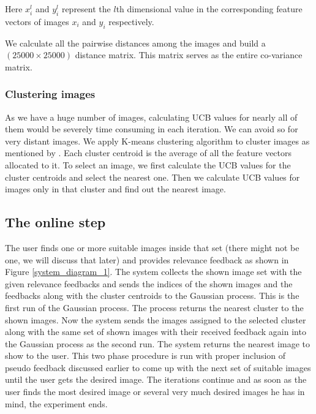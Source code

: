 \documentclass[english]{tktltiki}
\begin{document}
Here $x_i^l$ and $y_i^l$ represent the $l$th dimensional value in the corresponding feature vectors of images $x_i$ and $y_i$ respectively.


We calculate all the pairwise distances among the images and build a $(25000 \times 25000)$ distance matrix. This matrix serves as the entire co-variance matrix.

\subsubsection{Clustering images}

As we have a huge number of images, calculating UCB values for nearly all of them would be severely time consuming in each iteration. We can avoid so for very distant images. We apply K-means \cite{k_means} clustering algorithm to cluster images as mentioned by \cite{hierarchical_gp}. Each cluster centroid is the average of all the feature vectors allocated to it. To select an image, we first calculate the UCB values for the cluster centroids and select the nearest one. Then we calculate UCB values for images only in that cluster and find out the nearest image.

\subsection{The online step}

The user finds one or more suitable images inside that set (there might not be one, we will discuss that later) and provides relevance feedback as shown in Figure \ref{system_diagram_1}. The system collects the shown image set with the given relevance feedbacks and sends the indices of the shown images and the feedbacks along with the cluster centroids to the Gaussian process. This is the first run of the Gaussian process. The process returns the nearest cluster to the shown images. Now the system sends the images assigned to the selected cluster along with the same set of shown images with their received feedback again into the Gaussian process as the second run. The system returns the nearest image to show to the user. This two phase procedure is run with proper inclusion of pseudo feedback discussed earlier to come up with the next set of suitable images until the user gets the desired image. The iterations continue and as soon as the user finds the most desired image or several very much desired images he has in mind, the experiment ends.
\end{document}
